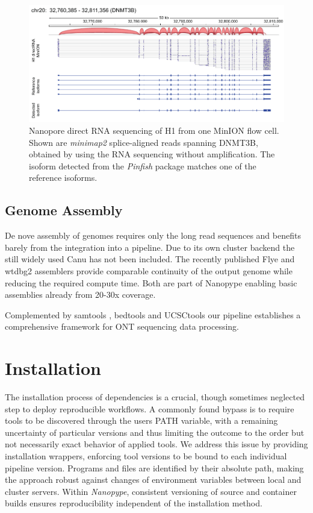 \begin{figure}[h]
	\centering
	\includegraphics[width=1.0\textwidth]{figures/nanopype/rna_isoforms.pdf}
	\captionsetup{format=plain}
	\caption[Nanopore direct RNA sequencing]{Nanopore direct RNA sequencing of H1 from one MinION flow cell. Shown are \textit{minimap2} splice-aligned reads spanning DNMT3B, obtained by using the RNA sequencing without amplification. The isoform detected from the \textit{Pinfish} package matches one of the reference isoforms.}
	\label{fig:nanopype:rna_isoforms}
\end{figure}


\subsection{Genome Assembly}
\label{subsec:nanopype:assembly}

De nove assembly of genomes requires only the long read sequences and benefits barely from the integration into a pipeline. Due to its own cluster backend the still widely used Canu \cite{Koren2017} has not been included. The recently published Flye \cite{Kolmogorov2019} and wtdbg2 \cite{Ruan2020} assemblers provide comparable continuity of the output genome while reducing the required compute time. Both are part of Nanopype enabling basic assemblies already from 20-30x coverage.

Complemented by samtools \cite{Li2009}, bedtools \cite{Quinlan2010} and UCSCtools \cite{Kent2010} our pipeline establishes a comprehensive framework for ONT sequencing data processing.




\section{Installation}
\label{sec:nanopype:installation}

The installation process of dependencies is a crucial, though sometimes neglected step to deploy reproducible workflows. A commonly found bypass is to require tools to be discovered through the users PATH variable, with a remaining uncertainty of particular versions and thus limiting the outcome to the order but not necessarily exact behavior of applied tools. We address this issue by providing installation wrappers, enforcing tool versions to be bound to each individual pipeline version. Programs and files are identified by their absolute path, making the approach robust against changes of environment variables between local and cluster servers. Within \textit{Nanopype}, consistent versioning of source and container builds ensures reproducibility independent of the installation method.


